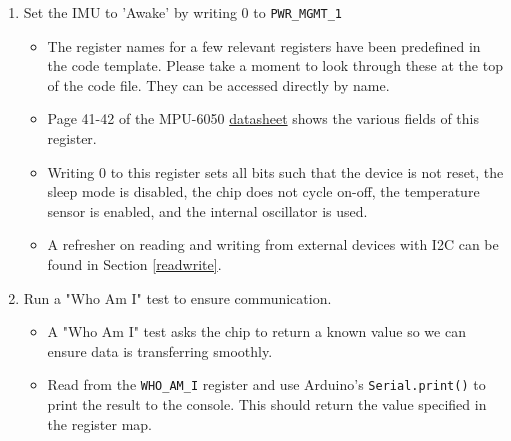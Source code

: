 \documentclass{article}
\begin{document}
        \begin{enumerate}
            \item Set the IMU to 'Awake' by writing 0 to \texttt{PWR\_MGMT\_1}
            \begin{itemize}
                \item The register names for a few relevant registers have been predefined in the code template. Please take a moment to look through these at the top of the code file. They can be accessed directly by name.
                \item Page 41-42 of the MPU-6050 \href{https://cdn.sparkfun.com/datasheets/Sensors/Accelerometers/RM-MPU-6000A.pdf}{datasheet} shows the various fields of this register.
                \item Writing 0 to this register sets all bits such that the device is not reset, the sleep mode is disabled, the chip does not cycle on-off, the temperature sensor is enabled, and the internal oscillator is used.
                \item A refresher on reading and writing from external devices with I2C can be found in Section \ref{readwrite}.
            \end{itemize}
            \item Run a "Who Am I" test to ensure communication.
            \begin{itemize}
                \item A "Who Am I" test asks the chip to return a known value so we can ensure data is transferring smoothly.
                \item Read from the \texttt{WHO\_AM\_I} register and use Arduino's \texttt{Serial.print()} to print the result to the console. This should return the value specified in the register map. 
            \end{itemize}
        \end{enumerate}
\end{document}
